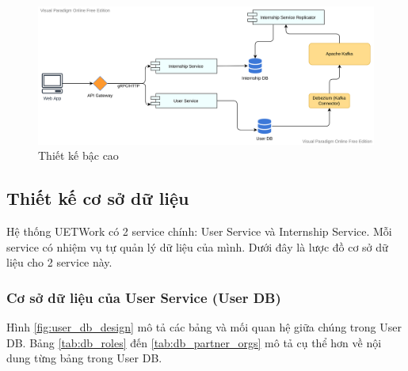\documentclass[./../main.tex]{subfiles}
\begin{document}
\begin{figure}
	\includegraphics[width=\linewidth]{./images/image6.png}
	\caption{Thiết kế bậc cao}
	\label{fig:high_level_design}
\end{figure}

\subsection{Thiết kế cơ sở dữ liệu}

Hệ thống UETWork có 2 service chính: User Service và Internship Service. Mỗi service có nhiệm vụ tự quản lý dữ liệu của mình. Dưới đây là lược đồ cơ sở dữ liệu cho 2 service này.

\subsubsection{Cơ sở dữ liệu của User Service (User DB)}

Hình \ref{fig:user_db_design} mô tả các bảng và mối quan hệ giữa chúng trong User DB. Bảng \ref{tab:db_roles} đến \ref{tab:db_partner_orgs} mô tả cụ thể hơn về nội dung từng bảng trong User DB.
\end{document}
